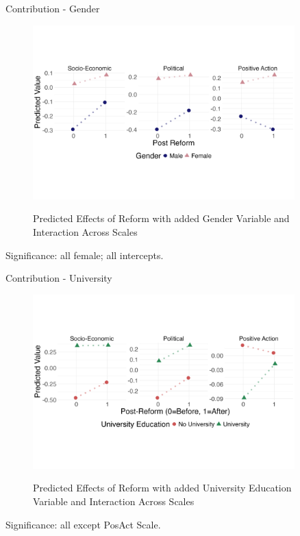 \documentclass{beamer}
\begin{document}
	\begin{frame}{Contribution - Gender}
		
		\begin{figure}
			\centering
			\captionsetup{justification=centering, labelsep=period} 
			\caption{Predicted Effects of Reform with added Gender Variable and Interaction Across Scales}
			\vspace*{-1cm}
			\includegraphics[width=0.9\textwidth]{gender_plot}
			\label{fig:gender_plot}
		\end{figure}
	\vspace{-1.5cm}	
	Significance: all female; all intercepts. 
		
	\end{frame}
	
	\begin{frame}{Contribution - University}
		\begin{figure}
			\centering
			\captionsetup{justification=centering, labelsep=period} 
			\caption{Predicted Effects of Reform with added University Education Variable and Interaction Across Scales}
			\vspace*{-1cm}
			\includegraphics[width=0.9\textwidth]{univ_plot}
			\label{fig:univ_plot}
		\end{figure}
		\vspace{-1.5cm}	
		Significance: all except PosAct Scale. 
			
	\end{frame}
	
\end{document}
